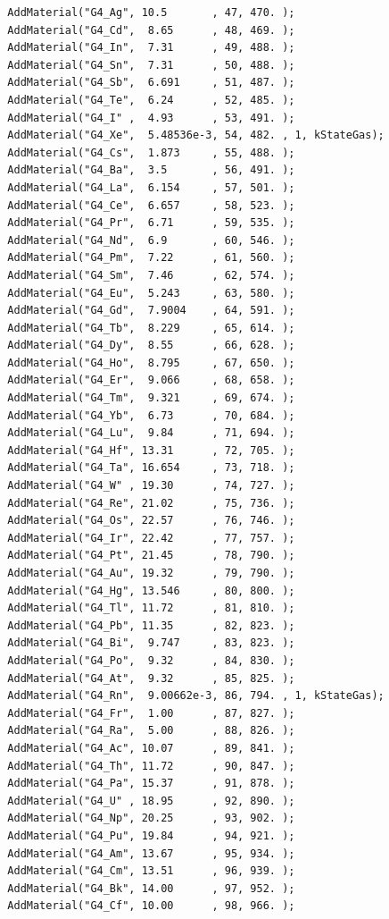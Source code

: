 \documentclass[a4paper,12pt]{article}
\begin{document}
\begin{verbatim}
  AddMaterial("G4_Ag", 10.5       , 47, 470. );
  AddMaterial("G4_Cd",  8.65      , 48, 469. );
  AddMaterial("G4_In",  7.31      , 49, 488. );
  AddMaterial("G4_Sn",  7.31      , 50, 488. );
  AddMaterial("G4_Sb",  6.691     , 51, 487. );
  AddMaterial("G4_Te",  6.24      , 52, 485. );
  AddMaterial("G4_I" ,  4.93      , 53, 491. );
  AddMaterial("G4_Xe",  5.48536e-3, 54, 482. , 1, kStateGas);
  AddMaterial("G4_Cs",  1.873     , 55, 488. );
  AddMaterial("G4_Ba",  3.5       , 56, 491. );
  AddMaterial("G4_La",  6.154     , 57, 501. );
  AddMaterial("G4_Ce",  6.657     , 58, 523. );
  AddMaterial("G4_Pr",  6.71      , 59, 535. );
  AddMaterial("G4_Nd",  6.9       , 60, 546. );
  AddMaterial("G4_Pm",  7.22      , 61, 560. );
  AddMaterial("G4_Sm",  7.46      , 62, 574. );
  AddMaterial("G4_Eu",  5.243     , 63, 580. );
  AddMaterial("G4_Gd",  7.9004    , 64, 591. );
  AddMaterial("G4_Tb",  8.229     , 65, 614. );
  AddMaterial("G4_Dy",  8.55      , 66, 628. );
  AddMaterial("G4_Ho",  8.795     , 67, 650. );
  AddMaterial("G4_Er",  9.066     , 68, 658. );
  AddMaterial("G4_Tm",  9.321     , 69, 674. );
  AddMaterial("G4_Yb",  6.73      , 70, 684. );
  AddMaterial("G4_Lu",  9.84      , 71, 694. );
  AddMaterial("G4_Hf", 13.31      , 72, 705. );
  AddMaterial("G4_Ta", 16.654     , 73, 718. );
  AddMaterial("G4_W" , 19.30      , 74, 727. );
  AddMaterial("G4_Re", 21.02      , 75, 736. );
  AddMaterial("G4_Os", 22.57      , 76, 746. );
  AddMaterial("G4_Ir", 22.42      , 77, 757. );
  AddMaterial("G4_Pt", 21.45      , 78, 790. );
  AddMaterial("G4_Au", 19.32      , 79, 790. );
  AddMaterial("G4_Hg", 13.546     , 80, 800. );
  AddMaterial("G4_Tl", 11.72      , 81, 810. );
  AddMaterial("G4_Pb", 11.35      , 82, 823. );
  AddMaterial("G4_Bi",  9.747     , 83, 823. );
  AddMaterial("G4_Po",  9.32      , 84, 830. );
  AddMaterial("G4_At",  9.32      , 85, 825. );
  AddMaterial("G4_Rn",  9.00662e-3, 86, 794. , 1, kStateGas);
  AddMaterial("G4_Fr",  1.00      , 87, 827. );
  AddMaterial("G4_Ra",  5.00      , 88, 826. );
  AddMaterial("G4_Ac", 10.07      , 89, 841. );
  AddMaterial("G4_Th", 11.72      , 90, 847. );
  AddMaterial("G4_Pa", 15.37      , 91, 878. );
  AddMaterial("G4_U" , 18.95      , 92, 890. );
  AddMaterial("G4_Np", 20.25      , 93, 902. );
  AddMaterial("G4_Pu", 19.84      , 94, 921. );
  AddMaterial("G4_Am", 13.67      , 95, 934. );
  AddMaterial("G4_Cm", 13.51      , 96, 939. );
  AddMaterial("G4_Bk", 14.00      , 97, 952. );
  AddMaterial("G4_Cf", 10.00      , 98, 966. );


\end{verbatim}
\end{document}
